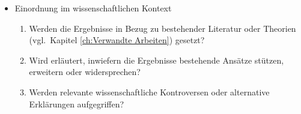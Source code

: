 {\begin{itemize}
\begin{enumerate}[resume]
        \end{enumerate}
    \item Einordnung im wissenschaftlichen Kontext
        \begin{enumerate}[resume]
            \item Werden die Ergebnisse in Bezug zu bestehender Literatur oder Theorien (vgl.~Kapitel \ref{ch:Verwandte Arbeiten}) gesetzt?
            \item Wird erläutert, inwiefern die Ergebnisse bestehende Ansätze stützen, erweitern oder widersprechen?
            \item Werden relevante wissenschaftliche Kontroversen oder alternative Erklärungen aufgegriffen?
            \setcounter{lastenumcounter}{\value{enumi}}
        \end{enumerate}
\end{itemize}
}
